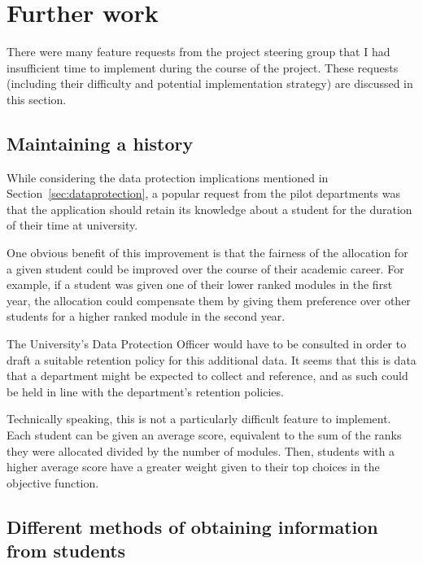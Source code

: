 
\section{Further work}
\label{sec:furtherwork}


There were many feature requests from the project steering group that I had
insufficient time to implement during the course of the project. These
requests (including their difficulty and potential implementation strategy)
are discussed in this section.

\subsection{Maintaining a history}

While considering the data protection implications mentioned in
Section~\ref{sec:dataprotection}, a popular request from the pilot departments
was that the application should retain its knowledge about a student for the
duration of their time at university.

One obvious benefit of this improvement is that the fairness of the allocation
for a given student could be improved over the course of their academic
career. For example, if a student was given one of their lower ranked modules
in the first year, the allocation could compensate them by giving them
preference over other students for a higher ranked module in the second
year.

The University's Data Protection Officer would have to be consulted in order
to draft a suitable retention policy for this additional data. It seems that
this is data that a department might be expected to collect and reference, and
as such could be held in line with the department's retention policies.

Technically speaking, this is not a particularly difficult feature to
implement. Each student can be given an average score, equivalent to the sum
of the ranks they were allocated divided by the number of modules. Then,
students with a higher average score have a greater weight given to their top
choices in the objective function.

\subsection{Different methods of obtaining information from students}

